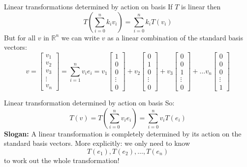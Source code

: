 \documentclass{beamer}
\begin{document}
\begin{frame}{Linear transformations determined by action on basis}
If $T$ is linear then
\begin{equation*}
T\left(\sum_{i=0}^n k_i v_i\right) = \sum_{i=0}^n k_i T(v_i)
\end{equation*}
But for all $v$ in $\mathbb{R}^n$ we can write $v$ as a linear combination of the standard basis vectors:
\begin{equation*}
v = \left[
\begin{array}{c}
v_1\\
v_2\\
v_3\\
\vdots\\
v_n
\end{array}
\right] = \sum_{i=1}^n v_i e_i = v_1 \left[
\begin{array}{c}
1\\
0\\
0\\
\vdots\\
0
\end{array}
\right] + v_2 \left[
\begin{array}{c}
0\\
1\\
0\\
\vdots\\
0
\end{array}
\right] + v_3 \left[
\begin{array}{c}
0\\
0\\
1\\
\vdots\\
0
\end{array}
\right]+\dots v_n \left[
\begin{array}{c}
0\\
0\\
0\\
\vdots\\
1
\end{array}
\right]
\end{equation*}
\end{frame}

\begin{frame}{Linear transformation determined by action on basis}
So:
\begin{equation*}
T(v) = T\left(\sum_{i=0}^n v_i e_i\right) = \sum_{i=0}^n v_i T(e_i)
\end{equation*}\vfill
{\bf Slogan:} A linear transformation is completely determined by its action on the standard basis vectors.\vfill
More explicitly: we only need to know
\begin{equation*}
T(e_1), T(e_2),\dots, T(e_n)
\end{equation*}
to work out the whole transformation!
\end{frame}
\end{document}
